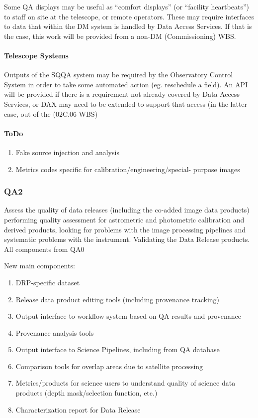 Some QA displays may be useful as ``comfort displays'' (or ``facility heartbeats'') to staff on site at the telescope, or remote operators. These may require interfaces to data that within the DM system is handled by Data Access Services. If that is the case, this work will be provided from a non-DM (Commissioning) WBS.

\paragraph{Telescope Systems}
\label{sec:qaTelescopeSystem}

Outputs of the SQQA system may be required by the Observatory Control
System in order to take some automated action (eg. reschedule a
field). An API will be provided if there is a requirement not already
covered by Data Access Services, or DAX may need to be extended to support that access (in the latter case, out of the (02C.06 WBS)

\paragraph{ToDo}

\begin{enumerate}

\item Fake source injection and analysis


\item Metrics codes specific for calibration/engineering/special- purpose images
\end{enumerate}

\subsubsection{QA2}
Assess the quality of data releases (including the co-added image data products) performing quality assessment for astrometric and photometric calibration and derived products, looking for problems with the image processing pipelines and systematic problems with the instrument.
Validating the Data Release products.
All components from QA0

New main components:
\begin{enumerate}
\item DRP-specific dataset
\item Release data product editing tools (including provenance tracking)
\item Output interface to workflow system based on QA results and provenance
\item Provenance analysis tools
\item Output interface to Science Pipelines, including from QA database
\item Comparison tools for overlap areas due to satellite processing 
\item Metrics/products for science users to understand quality of science data products (depth mask/selection function, etc.)
\item Characterization report for Data Release
\end{enumerate}

